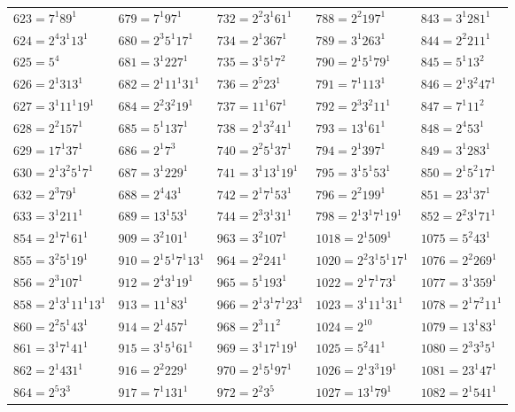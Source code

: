 {\begin{longtable}[c]{*{5}{l}}
$623=7^{1}89^{1}$&$679=7^{1}97^{1}$&$732=2^{2}3^{1}61^{1}$&$788=2^{2}197^{1}$&$843=3^{1}281^{1}$\\
$624=2^{4}3^{1}13^{1}$&$680=2^{3}5^{1}17^{1}$&$734=2^{1}367^{1}$&$789=3^{1}263^{1}$&$844=2^{2}211^{1}$\\
$625=5^{4}$&$681=3^{1}227^{1}$&$735=3^{1}5^{1}7^{2}$&$790=2^{1}5^{1}79^{1}$&$845=5^{1}13^{2}$\\
$626=2^{1}313^{1}$&$682=2^{1}11^{1}31^{1}$&$736=2^{5}23^{1}$&$791=7^{1}113^{1}$&$846=2^{1}3^{2}47^{1}$\\
$627=3^{1}11^{1}19^{1}$&$684=2^{2}3^{2}19^{1}$&$737=11^{1}67^{1}$&$792=2^{3}3^{2}11^{1}$&$847=7^{1}11^{2}$\\
$628=2^{2}157^{1}$&$685=5^{1}137^{1}$&$738=2^{1}3^{2}41^{1}$&$793=13^{1}61^{1}$&$848=2^{4}53^{1}$\\
$629=17^{1}37^{1}$&$686=2^{1}7^{3}$&$740=2^{2}5^{1}37^{1}$&$794=2^{1}397^{1}$&$849=3^{1}283^{1}$\\
$630=2^{1}3^{2}5^{1}7^{1}$&$687=3^{1}229^{1}$&$741=3^{1}13^{1}19^{1}$&$795=3^{1}5^{1}53^{1}$&$850=2^{1}5^{2}17^{1}$\\
$632=2^{3}79^{1}$&$688=2^{4}43^{1}$&$742=2^{1}7^{1}53^{1}$&$796=2^{2}199^{1}$&$851=23^{1}37^{1}$\\
$633=3^{1}211^{1}$&$689=13^{1}53^{1}$&$744=2^{3}3^{1}31^{1}$&$798=2^{1}3^{1}7^{1}19^{1}$&$852=2^{2}3^{1}71^{1}$\\
\pagebreak
$854=2^{1}7^{1}61^{1}$&$909=3^{2}101^{1}$&$963=3^{2}107^{1}$&$1018=2^{1}509^{1}$&$1075=5^{2}43^{1}$\\
$855=3^{2}5^{1}19^{1}$&$910=2^{1}5^{1}7^{1}13^{1}$&$964=2^{2}241^{1}$&$1020=2^{2}3^{1}5^{1}17^{1}$&$1076=2^{2}269^{1}$\\
$856=2^{3}107^{1}$&$912=2^{4}3^{1}19^{1}$&$965=5^{1}193^{1}$&$1022=2^{1}7^{1}73^{1}$&$1077=3^{1}359^{1}$\\
$858=2^{1}3^{1}11^{1}13^{1}$&$913=11^{1}83^{1}$&$966=2^{1}3^{1}7^{1}23^{1}$&$1023=3^{1}11^{1}31^{1}$&$1078=2^{1}7^{2}11^{1}$\\
$860=2^{2}5^{1}43^{1}$&$914=2^{1}457^{1}$&$968=2^{3}11^{2}$&$1024=2^{10}$&$1079=13^{1}83^{1}$\\
$861=3^{1}7^{1}41^{1}$&$915=3^{1}5^{1}61^{1}$&$969=3^{1}17^{1}19^{1}$&$1025=5^{2}41^{1}$&$1080=2^{3}3^{3}5^{1}$\\
$862=2^{1}431^{1}$&$916=2^{2}229^{1}$&$970=2^{1}5^{1}97^{1}$&$1026=2^{1}3^{3}19^{1}$&$1081=23^{1}47^{1}$\\
$864=2^{5}3^{3}$&$917=7^{1}131^{1}$&$972=2^{2}3^{5}$&$1027=13^{1}79^{1}$&$1082=2^{1}541^{1}$\\

\end{longtable}}
